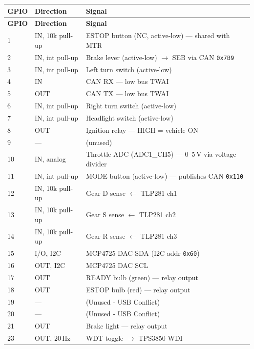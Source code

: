 \documentclass[12pt,a4paper,oneside]{report}
\newcommand{\canid}[1]{\texttt{0x#1}}
\newcommand{\iicaddr}[1]{\texttt{0x#1}}
\begin{document}
\begin{center}
\begin{longtable}{lll}
\toprule
\textbf{GPIO} & \textbf{Direction} & \textbf{Signal} \\
\midrule
\endfirsthead
\toprule
\textbf{GPIO} & \textbf{Direction} & \textbf{Signal} \\
\midrule
\endhead
1  & IN, 10k pull-up  & ESTOP button (NC, active-low) --- shared with MTR \\
2  & IN, int pull-up  & Brake lever (active-low) $\rightarrow$ SEB via CAN \canid{7B9} \\
3  & IN, int pull-up  & Left turn switch (active-low) \\
4  & IN               & CAN RX --- low bus TWAI \\
5  & OUT              & CAN TX --- low bus TWAI \\
6  & IN, int pull-up  & Right turn switch (active-low) \\
7  & IN, int pull-up  & Headlight switch (active-low) \\
8  & OUT              & Ignition relay --- HIGH = vehicle ON \\
9  & ---              & (unused) \\
10 & IN, analog       & Throttle ADC (ADC1\_CH5) --- 0--5\,V via voltage divider \\
11 & IN, int pull-up  & MODE button (active-low) --- publishes CAN \canid{110} \\
12 & IN, 10k pull-up  & Gear D sense $\leftarrow$ TLP281 ch1 \\
13 & IN, 10k pull-up  & Gear S sense $\leftarrow$ TLP281 ch2 \\
14 & IN, 10k pull-up  & Gear R sense $\leftarrow$ TLP281 ch3 \\
15 & I/O, I2C         & MCP4725 DAC SDA (I2C addr \iicaddr{60}) \\
16 & OUT, I2C         & MCP4725 DAC SCL \\
17 & OUT              & READY bulb (green) --- relay output \\
18 & OUT              & ESTOP bulb (red) --- relay output \\
19 & ---              & (Unused - USB Conflict) \\
20 & ---              & (Unused - USB Conflict) \\
21 & OUT              & Brake light --- relay output \\
23 & OUT, 20\,Hz      & WDT toggle $\rightarrow$ TPS3850 WDI \\

\end{longtable}
\end{center}
\end{document}
